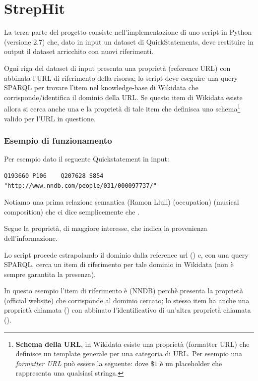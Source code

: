 \chapter{StrepHit}
\label{cha:strephit}
La terza parte del progetto consiste nell'implementazione di uno script in Python (versione 2.7) che, dato in input un dataset di QuickStatements, deve restituire in output il dataset
arricchito con nuovi riferimenti.

Ogni riga del dataset di input presenta una proprietà  (reference URL\cite{P854}) con abbinata l'URL di riferimento della risorsa; 
lo script deve eseguire una query SPARQL per trovare l'item nel knowledge-base di Wikidata che corrisponde/identifica il dominio della URL. 
Se questo item di Wikidata esiste allora si cerca anche una e la proprietà di tale item che definisca uno schema\footnote{
    \textbf{Schema della URL}, in Wikidata esiste una proprietà  (formatter URL\cite{P1630}) che definisce un template generale per una categoria di URL. 
    Per esempio una \textit{formatter URL} può essere la seguente:  dove $\$1$ è un placeholder che rappresenta una qualsiasi stringa.  
} valido per l'URL in questione.

\subsection{Esempio di funzionamento}
Per esempio dato il seguente Quickstatement in input:
\begin{lstlisting}[style=QuickstatementsStyle, caption=Riga del dump]
    Q193660	P106	Q207628	S854	"http://www.nndb.com/people/031/000097737/"
\end{lstlisting}

Notiamo una prima relazione semantica 
 (Ramon Llull\cite{Q193660}) 
 (occupation\cite{P106}) 
 (musical composition\cite{Q207628}) 
che ci dice semplicemente che .

Segue la proprietà, di maggiore interesse,  che indica la provenienza dell'informazione. 

Lo script procede estrapolando il dominio dalla reference url () e, con una query SPARQL, cerca un item di riferimento per tale dominio in Wikidata 
(non è sempre garantita la presenza).

In questo esempio l'item di riferimento è  (NNDB\cite{Q1373513}) perchè presenta la proprietà  (official website\cite{P856}) che corrisponde al dominio cercato;
lo stesso item ha anche una proprietà chiamata  () con abbinato l'identificativo di un'altra proprietà chiamata  
 ().

